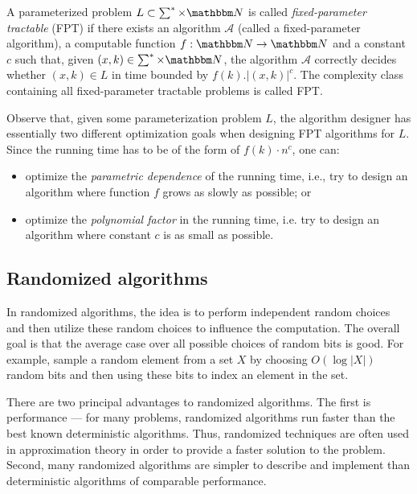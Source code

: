 \begin{definition}
 A parameterized problem $L \subset \sum^* \times \N$ is called \textit{fixed-parameter tractable} (FPT) if there exists an algorithm $\mathcal{A}$ (called a fixed-parameter algorithm),
 a computable function $f: \N \rightarrow \N$ and a constant $c$ such that, given $(x,k) \in \sum^* \times \N$, the algorithm $\mathcal{A}$ correctly decides
 whether $(x,k) \in L$ in time bounded by $f(k). |(x,k)|^c$.
 The complexity class containing all fixed-parameter tractable problems is called FPT.
\end{definition}

Observe that, given some parameterization problem $L$, the algorithm designer has essentially two different optimization goals when designing FPT algorithms for $L$.
Since the running time has to be of the form of $f(k)\cdot n^c$, one can:
\begin{itemize}
 \item optimize the \textit{parametric dependence} of the running time, i.e., try to design an algorithm where function $f$ grows as slowly as possible; or
 \item optimize the \textit{polynomial factor} in the running time, i.e. try to design an algorithm where constant $c$ is as small as possible.
\end{itemize}

\subsection{Randomized algorithms}
In randomized algorithms, the idea is to perform independent random choices and then utilize these random choices to influence the computation.
The overall goal is that the average case over all possible choices of random bits is good.
For example, sample a random element from a set $X$ by choosing $O(\log |X|)$ random bits and then using these
bits to index an element in the set. 

There are two principal advantages to randomized algorithms. The first is performance --- for many problems, 
randomized algorithms run faster than the best known deterministic algorithms.
Thus, randomized techniques are often used in approximation theory in order to provide a faster solution to the problem.
Second, many randomized algorithms are simpler to describe and implement than deterministic algorithms of
comparable performance. 

